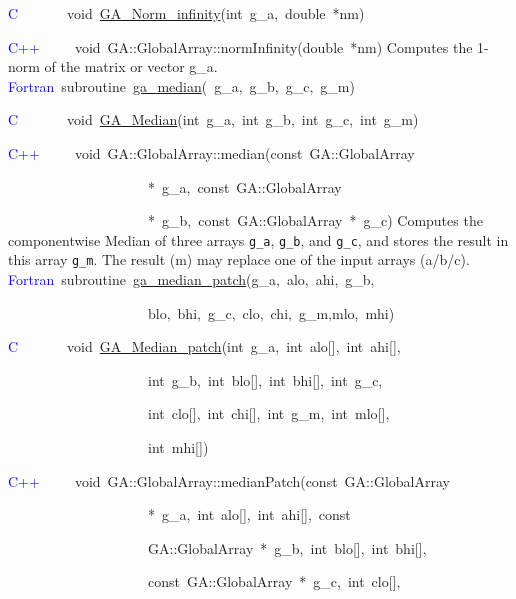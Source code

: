 \textcolor{blue}{C}~~~~~~~void~\href{http://www.emsl.pnl.gov/docs/global/c_nga_ops.html\#ga_norm_infinity}{GA\_{}Norm\_{}infinity}(int~g\_a,~double~{*}nm)~

\textcolor{blue}{C++}~~~~~void~GA::GlobalArray::normInfinity(double~{*}nm)
Computes the 1-norm of the matrix or vector g\_a. 
\textcolor{blue}{Fortran}~subroutine~\href{http://www.emsl.pnl.gov/docs/global/ga_ops.html\#ga_median}{ga\_{}median}(~g\_a,~g\_b,~g\_c,~g\_m)

\textcolor{blue}{C}~~~~~~~void~\href{http://www.emsl.pnl.gov/docs/global/c_nga_ops.html\#ga_median}{GA\_{}Median}(int~g\_a,~int~g\_b,~int~g\_c,~int~g\_m)

\textcolor{blue}{C++}~~~~~void~GA::GlobalArray::median(const~GA::GlobalArray~

~~~~~~~~~~~~~~~~~~~~{*}~g\_a,~const~GA::GlobalArray~

~~~~~~~~~~~~~~~~~~~~{*}~g\_b,~const~GA::GlobalArray~{*}~g\_c)
Computes the componentwise Median of three arrays \texttt{g\_a}, \texttt{g\_b},
and \texttt{g\_c}, and stores the result in this array \texttt{g\_m}.
The result (m) may replace one of the input arrays (a/b/c). 
\textcolor{blue}{Fortran}~subroutine~\href{http://www.emsl.pnl.gov/docs/global/ga_ops.html\#ga_median_patch}{ga\_{}median\_{}patch}(g\_a,~alo,~ahi,~g\_b,~

~~~~~~~~~~~~~~~~~~~~blo,~bhi,~g\_c,~clo,~chi,~g\_m,mlo,~mhi)~

\textcolor{blue}{C}~~~~~~~void~\href{http://www.emsl.pnl.gov/docs/global/c_nga_ops.html\#ga_median_patch}{GA\_{}Median\_{}patch}(int~g\_a,~int~alo{[}{]},~int~ahi{[}{]},~

~~~~~~~~~~~~~~~~~~~~int~g\_b,~int~blo{[}{]},~int~bhi{[}{]},~int~g\_c,~

~~~~~~~~~~~~~~~~~~~~int~clo{[}{]},~int~chi{[}{]},~int~g\_m,~int~mlo{[}{]},

~~~~~~~~~~~~~~~~~~~~int~mhi{[}{]})~

\textcolor{blue}{C++}~~~~~void~GA::GlobalArray::medianPatch(const~GA::GlobalArray

~~~~~~~~~~~~~~~~~~~~{*}~g\_a,~int~alo{[}{]},~int~ahi{[}{]},~const~

~~~~~~~~~~~~~~~~~~~~GA::GlobalArray~{*}~g\_b,~int~blo{[}{]},~int~bhi{[}{]},~

~~~~~~~~~~~~~~~~~~~~const~GA::GlobalArray~{*}~g\_c,~int~clo{[}{]},~

